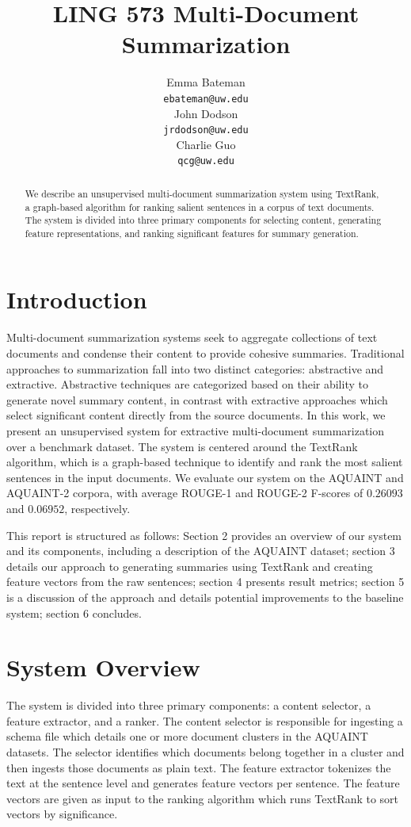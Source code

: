 \documentclass[11pt]{article}
\title{LING 573 Multi-Document Summarization}
\author{Emma Bateman \\
  {\tt ebateman@uw.edu} \\\And
  John Dodson \\
  {\tt jrdodson@uw.edu} \\\And
  Charlie Guo \\
  {\tt qcg@uw.edu}
  }
\date{}
\begin{document}
\maketitle
\begin{abstract}
We describe an unsupervised multi-document summarization system using TextRank, a graph-based algorithm for ranking salient sentences in a corpus of text documents. The system is divided into three primary components for selecting content, generating feature representations, and ranking significant features for summary generation.
\end{abstract}

\section{Introduction}

Multi-document summarization systems seek to aggregate collections of text documents and condense their content to provide cohesive summaries. Traditional approaches to summarization fall into two distinct categories: abstractive and extractive. Abstractive techniques are categorized based on their ability to generate novel summary content, in contrast with extractive approaches which select significant content directly from the source documents. In this work, we present an unsupervised system for extractive multi-document summarization over a benchmark dataset. The system is centered around the TextRank algorithm, which is a graph-based technique to identify and rank the most salient sentences in the input documents. We evaluate our system on the AQUAINT and AQUAINT-2 corpora, with average ROUGE-1 and ROUGE-2 F-scores of $0.26093$ and $0.06952$, respectively. 

This report is structured as follows: Section 2 provides an overview of our system and its components, including a description of the AQUAINT dataset; section 3 details our approach to generating summaries using TextRank and creating feature vectors from the raw sentences; section 4 presents result metrics; section 5 is a discussion of the approach and details potential improvements to the baseline system; section 6 concludes.

\section{System Overview}
The system is divided into three primary components: a content selector, a feature extractor, and a ranker. The content selector is responsible for ingesting a schema file which details one or more document clusters in the AQUAINT datasets. The selector identifies which documents belong together in a cluster and then ingests those documents as plain text. The feature extractor tokenizes the text at the sentence level and generates feature vectors per sentence. The feature vectors are given as input to the ranking algorithm which runs TextRank to sort vectors by significance. 
\end{document}
